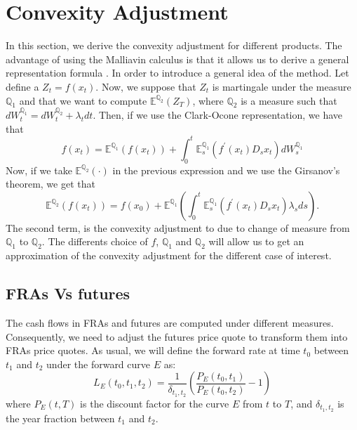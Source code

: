 \documentclass[a4paper,10pt]{article}
\newcommand{\1}{\mathbf{1}}
\begin{document}
\section{Convexity Adjustment}\label{sec:CA}
In this section, we derive the convexity adjustment for different products. The advantage of using the Malliavin calculus is that it allows us to derive a general representation formula . In order to introduce a general idea of the method. Let define a $Z_t = f(x_t)$. Now, we suppose that $Z_t$ is martingale under the measure $\mathbb{Q}_1$ and that we want to compute $\mathbb{E}^{\mathbb{Q}_2}\left(Z_T \right)$, where $\mathbb{Q}_2$ is a measure such that $dW^{\mathbb{Q}_1}_t = dW^{\mathbb{Q}_2}_t +\lambda_t dt$. Then, if we use the Clark-Ocone representation, we have that
\begin{equation*}
f(x_t) = \mathbb{E}^{\mathbb{Q}_1}\left(f(x_t)\right) + \int_{0}^{t} \mathbb{E}^{\mathbb{Q}_1}_s\left( f^{\prime}(x_t) D_s x_t  \right) dW^{\mathbb{Q}_1}_s
\end{equation*}
Now, if we take $\mathbb{E}^{\mathbb{Q}_2}\left( \cdot \right)$ in the previous expression and we use the Girsanov's theorem, we get that
\begin{equation}\label{general_convexity}
\mathbb{E}^{\mathbb{Q}_2}\left( f(x_t) \right) = f(x_0) + \mathbb{E}^{\mathbb{Q}_1} \left(\int_{0}^{t}  \mathbb{E}^{\mathbb{Q}_1}_s\left( f^{\prime}(x_t) D_s x_t  \right) \lambda_s ds \right). 
\end{equation}
The second term, is the convexity adjustment to due to change of measure from $\mathbb{Q}_1$ to $\mathbb{Q}_2$. The differents choice of $f$, $\mathbb{Q}_1$ and $\mathbb{Q}_2$ will allow us to get an approximation of the convexity adjustment for the different case of interest. 
\subsection{FRAs Vs futures}
 The cash flows in FRAs and futures are computed under different measures. Consequently, we need to adjust the futures price quote to transform them into FRAs price quotes. As usual, we will define the forward rate at time $t_0$ between $t_1$ and $t_2$ under the forward curve $E$ as:
\begin{equation}\label{forward_rate}
L_{E}(t_0, t_1, t_2) = \frac{1}{\delta_{t_1,t_2}}\left(\frac{P_{E}(t_0,t_1)}{P_{E}(t_0,t_2)} - 1 \right)
\end{equation} 
where $P_{E}(t,T)$ is the discount factor for the curve $E$ from $t$ to $T$, and $\delta_{t_1,t_2}$ is the year fraction between $t_1$ and $t_2$. 
\end{document}
